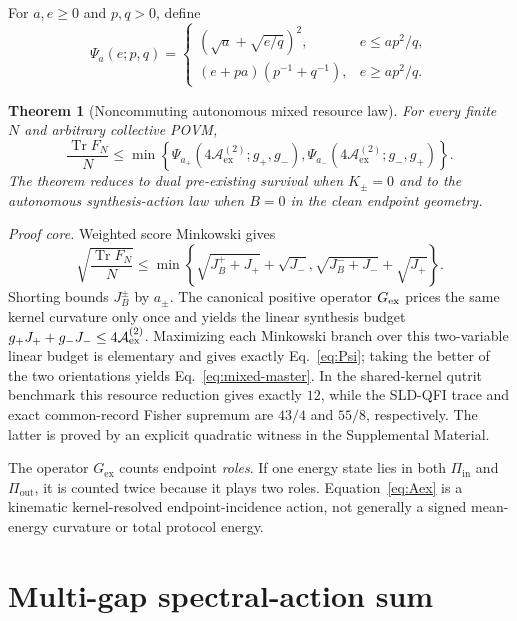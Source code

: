 \documentclass[aps,pra,preprint,nofootinbib]{revtex4-2}
\newtheorem{theorem}{Theorem}
\newcommand{\Tr}{\operatorname{Tr}}
\newcommand{\Fcl}{F}
\newcommand{\Aact}{\mathcal A}
\begin{document}
For $a,e\ge0$ and $p,q>0$, define
\begin{equation}
\Psi_a(e;p,q)=
\begin{cases}
(\sqrt a+\sqrt{e/q})^2,&e\le ap^2/q,\\[1mm]
(e+pa)(p^{-1}+q^{-1}),&e\ge ap^2/q.
\end{cases}
\label{eq:Psi}
\end{equation}

\begin{theorem}[Noncommuting autonomous mixed resource law]
\label{thm:mixed}
For every finite $N$ and arbitrary collective POVM,
\begin{equation}
\boxed{
\frac{\Tr \Fcl_N}{N}
\le
\min\!\left\{
\Psi_{a_+}(4\Aact_{\mathrm{ex}}^{(2)};g_+,g_-),
\Psi_{a_-}(4\Aact_{\mathrm{ex}}^{(2)};g_-,g_+)
\right\}.
}
\label{eq:mixed-master}
\end{equation}
The theorem reduces to dual pre-existing survival when $K_\pm=0$ and to the autonomous synthesis-action law when $B=0$ in the clean endpoint geometry.
\end{theorem}

\emph{Proof core.} Weighted score Minkowski gives
\begin{equation}
\sqrt{\frac{\Tr F_N}{N}}
\le\min\!\left\{
\sqrt{J_B^++J_+}+\sqrt{J_-},
\sqrt{J_B^-+J_-}+\sqrt{J_+}
\right\}.
\end{equation}
Shorting bounds $J_B^\pm$ by $a_\pm$. The canonical positive operator $G_{\rm ex}$ prices the same kernel curvature only once and yields the linear synthesis budget $g_+J_++g_-J_-\le4\Aact_{\rm ex}^{(2)}$. Maximizing each Minkowski branch over this two-variable linear budget is elementary and gives exactly Eq.~\eqref{eq:Psi}; taking the better of the two orientations yields Eq.~\eqref{eq:mixed-master}. In the shared-kernel qutrit benchmark this resource reduction gives exactly $12$, while the SLD-QFI trace and exact common-record Fisher supremum are $43/4$ and $55/8$, respectively. The latter is proved by an explicit quadratic witness in the Supplemental Material.

The operator $G_{\mathrm{ex}}$ counts endpoint \emph{roles}. If one energy state lies in both $\Pi_{\mathrm{in}}$ and $\Pi_{\mathrm{out}}$, it is counted twice because it plays two roles. Equation~\eqref{eq:Aex} is a kinematic kernel-resolved endpoint-incidence action, not generally a signed mean-energy curvature or total protocol energy.

\section{Multi-gap spectral-action sum}
\label{sec:multigap}
\end{document}
